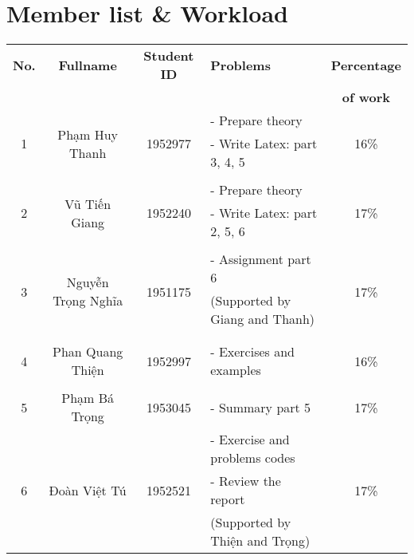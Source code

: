 \documentclass[a4paper]{article}
\begin{document}

\newpage
\tableofcontents
\newpage


\section{Member list \& Workload}

\begin{center}
\begin{tabular}{|c|c|c|l|c|}
\hline
\textbf{No.} & \textbf{Fullname} & \textbf{Student ID} & \textbf{Problems} & \textbf{Percentage}\\
 & & & & \textbf{of work}\\
\hline 
\multirow{3}{*}{1} & \multirow{3}{*}{Phạm Huy Thanh} & \multirow{3}{*}{1952977} & - Prepare theory & 
\multirow{3}{*}{16\%}\\
 & &  & - Write Latex: part 3, 4, 5 &\\
 & &  & &\\
\hline 
\multirow{3}{*}{2} & \multirow{3}{*}{Vũ Tiến Giang} & \multirow{3}{*}{1952240} & - Prepare theory & 
\multirow{3}{*}{17\%}\\
 & &  & - Write Latex: part 2, 5, 6 &\\
 & &  & &\\
\hline
\multirow{3}{*}{3} & \multirow{3}{*}{Nguyễn Trọng Nghĩa} & \multirow{3}{*}{1951175} & - Assignment part 6 & 
\multirow{3}{*}{17\%}\\
 & &  & (Supported by Giang and Thanh) &\\
 & &  & &\\
\hline
\multirow{3}{*}{4} & \multirow{3}{*}{Phan Quang Thiện} & \multirow{3}{*}{1952997} &  & 
\multirow{3}{*}{16\%}\\
 & &  & - Exercises and examples &\\
 & &  & &\\
\hline
\multirow{3}{*}{5} & \multirow{3}{*}{Phạm Bá Trọng} & \multirow{3}{*}{1953045} & & \multirow{3}{*}{17\%}\\
 & &  & - Summary part 5 &\\
 & &  & &\\
\hline
\multirow{3}{*}{6} & \multirow{3}{*}{Đoàn Việt Tú} & 
\multirow{3}{*}{1952521} & - Exercise and problems codes & \multirow{3}{*}{17\%}\\
 & &  & - Review the report &\\
 & &  & (Supported by Thiện and Trọng) &\\
\hline
\end{tabular}
\end{center}
\end{document}
